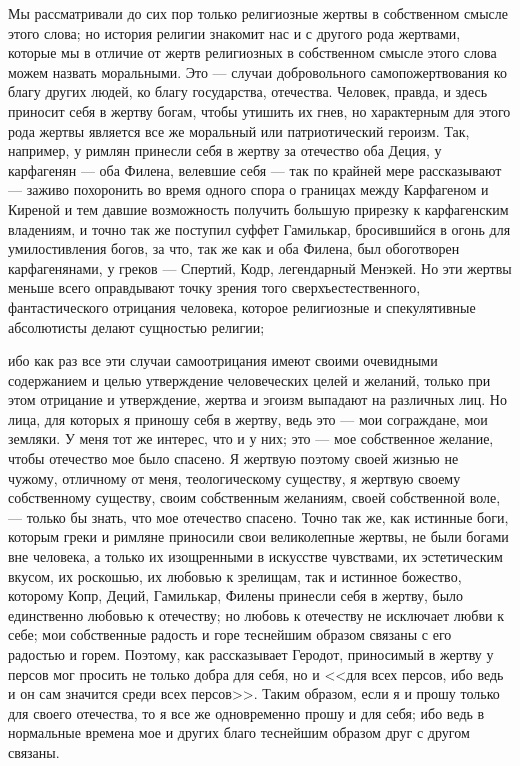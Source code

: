 \documentclass[12pt]{article}
\begin{document}
Мы рассматривали до сих пор только религиозные жертвы в собственном смысле этого слова; но история религии знакомит нас и с другого рода жертвами, которые мы в отличие от жертв религиозных в собственном смысле этого слова можем назвать моральными. Это --- случаи добровольного самопожертвования ко благу других людей, ко благу государства, отечества. Человек, правда, и здесь приносит себя в жертву богам, чтобы утишить их гнев, но характерным для этого рода жертвы является все же моральный или патриотический героизм. Так, например, у римлян принесли себя в жертву за отечество оба Деция, у карфагенян --- оба Филена, велевшие себя --- так по крайней мере рассказывают --- заживо похоронить во время одного спора о границах между Карфагеном и Киреной и тем давшие возможность получить большую прирезку к карфагенским владениям, и точно так же поступил суффет Гамилькар, бросившийся в огонь для умилостивления богов, за что, так же как и оба Филена, был обоготворен карфагенянами, у греков --- Спертий, Кодр, легендарный Менэкей. Но эти жертвы меньше всего оправдывают точку зрения того сверхъестественного, фантастического отрицания человека, которое религиозные и спекулятивные абсолютисты делают сущностью религии; 

ибо как раз все эти случаи самоотрицания имеют своими очевидными содержанием и целью утверждение человеческих целей и желаний, только при этом отрицание и утверждение, жертва и эгоизм выпадают на различных лиц. Но лица, для которых я приношу себя в жертву, ведь это --- мои сограждане, мои земляки. У меня тот же интерес, что и у них; это --- мое собственное желание, чтобы отечество мое было спасено. Я жертвую поэтому своей жизнью не чужому, отличному от меня, теологическому существу, я жертвую своему собственному существу, своим собственным желаниям, своей собственной воле, --- только бы знать, что мое отечество спасено. Точно так же, как истинные боги, которым греки и римляне приносили свои великолепные жертвы, не были богами вне человека, а только их изощренными в искусстве чувствами, их эстетическим вкусом, их роскошью, их любовью к зрелищам, так и истинное божество, которому Копр, Деций, Гамилькар, Филены принесли себя в жертву, было единственно любовью к отечеству; но любовь к отечеству не исключает любви к себе; мои собственные радость и горе теснейшим образом связаны с его радостью и горем. Поэтому, как рассказывает Геродот, приносимый в жертву у персов мог просить не только добра для себя, но и <<для всех персов, ибо ведь и он сам значится среди всех персов>>. Таким образом, если я и прошу только для своего отечества, то я все же одновременно прошу и для себя; ибо ведь в нормальные времена мое и других благо теснейшим образом друг с другом связаны. 
\end{document}
